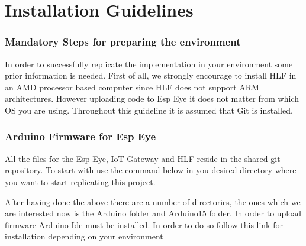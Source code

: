 \appendix

\chapter{Installation Guidelines}

\subsection{Mandatory Steps for preparing the environment}
In order to successfully replicate the implementation in your environment some prior information is needed. First of all, we strongly encourage to install HLF in an AMD processor based computer since HLF does not support ARM architectures. However uploading code to Esp Eye it does not matter from which OS you are using. Throughout this guideline it is assumed that Git is installed. 

\subsection{Arduino Firmware for Esp Eye}

All the files for the Esp Eye, IoT Gateway and HLF reside in the shared git repository. To start with use the command below in you desired directory where you want to start replicating this project. 


 \par

After having done the above there are a number of directories, the ones which we are interested now is the {\selectfont Arduino} folder and {\selectfont Arduino15} folder. In order to upload firmware Arduino Ide must be installed. 
In order to do so follow this link for installation depending on your environment 

